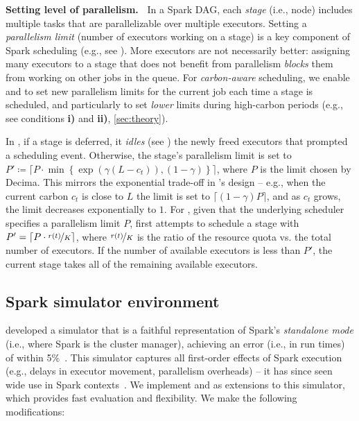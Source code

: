 \vspace{0.05cm}
\noindent \textbf{Setting level of parallelism.\ }
In a Spark DAG, each \textit{stage} (i.e., node) includes multiple tasks that are parallelizable over multiple executors.
Setting a \textit{parallelism limit} (number of executors working on a stage) is a key component of Spark scheduling (e.g., see \cite[Section 5.2]{Hongzi:2019:Decima}). 
More executors are not necessarily better: assigning many executors to a stage that does not benefit from parallelism \textit{blocks} them from working on other jobs in the queue.
For \textit{carbon-aware} scheduling, we enable \DANISH and \CAP to set new parallelism limits for the current job each time a stage is scheduled, and particularly to set \textit{lower} limits during high-carbon periods (e.g., see conditions \textbf{i)} and \textbf{ii)}, \autoref{sec:theory}).

In \DANISH, if a stage is deferred, it \textit{idles} (see ) the newly freed executors that prompted a scheduling event.  Otherwise, the stage's parallelism limit is set to $P' \coloneqq \lceil P \cdot \min \left\{ \exp( \gamma (L - c_t) ), (1-\gamma) \right\} \rceil$, where $P$ is the limit chosen by Decima.  This mirrors the exponential trade-off in \DANISH's design -- e.g., when the current carbon $c_t$ is close to $L$ the limit is set to $\lceil (1- \gamma) P \rceil$, and as $c_t$ grows, the limit decreases exponentially to $1$.
For \CAP, given that the underlying scheduler specifies a parallelism limit $P$, \CAP first attempts to schedule a stage with $P' = \lceil P \cdot \nicefrac{r(t)}{K} \rceil$, where $\nicefrac{r(t)}{K}$ is the ratio of the resource quota vs. the total number of executors.  If the number of available executors is less than $P'$, the current stage takes all of the remaining available executors.

\vspace{-0.5em}
\subsection{Spark simulator environment} \label{sec:spark-sim-imp}
\citet{Hongzi:2019:Decima} developed a simulator %
that is a faithful representation of Spark's \textit{standalone mode}  (i.e., where Spark is the cluster manager), achieving an error (i.e., in run times) of within 5\%~\cite[Fig. 18]{Hongzi:2019:Decima}.
This simulator captures all first-order effects of Spark execution (e.g., delays in executor movement, parallelism overheads) -- it has since seen wide use in Spark contexts~\cite{Shin:24, Hu:24, Gertsman:23, Mathur:23, Li:23:JSS, Bengre:21}.
We implement \DANISH and \CAP as extensions to this simulator, which provides fast evaluation and flexibility.  We make the following modifications:


